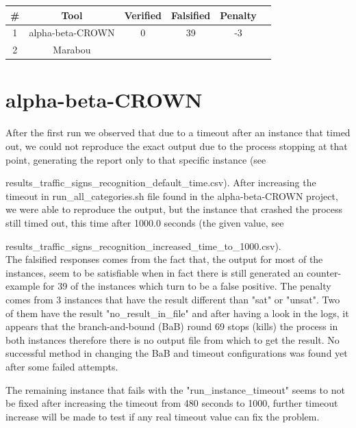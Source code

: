 \documentclass[12pt,a4paper]{report}
\newcommand\tab[1][5mm]{\hspace*{#1}}
\begin{document}
\begin{center}
\begin{tabular}{ c c c c c c}
 \hline
 \textbf{\#} & \textbf{Tool} & \textbf{Verified} & \textbf{Falsified} & \textbf{Penalty}\\
 \hline
 1 & alpha-beta-CROWN & 0 & 39 & -3\\
 \hline
 2 & Marabou\\
 \hline
\end{tabular}
\end{center}
\vspace{10pt}

\section{alpha-beta-CROWN}
\tab After the first run we observed that due to a timeout after an instance that timed out, we could not reproduce the exact output due to the process stopping at that point, generating the report only to that specific instance (see

results\_traffic\_signs\_recognition\_default\_time.csv\cite{traffic_signs_recognition_first_solution}). After increasing the timeout in run\_all\_categories.sh file found in the alpha-beta-CROWN project, we were able to reproduce the output, but the instance that crashed the process still timed out, this time after 1000.0 seconds (the given value, see

results\_traffic\_signs\_recognition\_increased\_time\_to\_1000.csv\cite{traffic_signs_recognition_second_solution}).\\

The falsified responses comes from the fact that, the output for most of the instances, seem to be satisfiable when in fact there is still generated an counter-example for 39 of the instances which turn to be a false positive. The penalty comes from 3 instances that have the result different than "sat" or "unsat". Two of them have the result "no\_result\_in\_file" and after having a look in the logs, it appears that the branch-and-bound (BaB) round 69 stops (kills) the process in both instances therefore there is no output file from which to get the result. No successful method in changing the BaB and timeout configurations was found yet after some failed attempts.

The remaining instance that fails with the "run\_instance\_timeout" seems to not be fixed after increasing the timeout from 480 seconds to 1000, further timeout increase will be made to test if any real timeout value can fix the problem.
\end{document}
